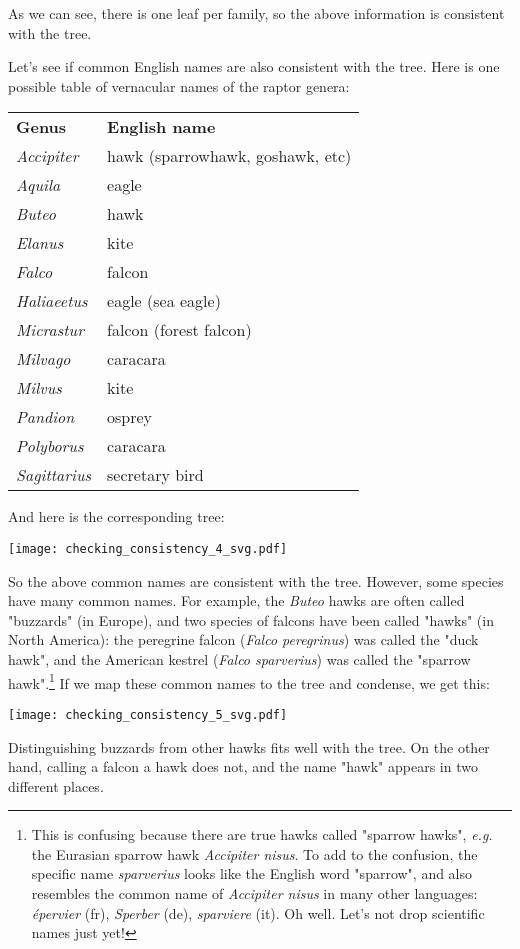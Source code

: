 \bigskip{}
\noindent{}As we can see, there is one leaf per family, so the above
information is consistent with the tree.

Let's see if common English names are also consistent with the tree. Here is
one possible table of vernacular names of the raptor genera: 

\bigskip{}
\begin{tabular}{ll}
\textbf{Genus} & \textbf{English name} \\
\textit{Accipiter} & hawk (sparrowhawk, goshawk, etc)\\
\textit{Aquila} & eagle  \\
\textit{Buteo} & hawk \\
\textit{Elanus} & kite \\
\textit{Falco} & falcon \\
\textit{Haliaeetus} & eagle (sea eagle) \\
\textit{Micrastur} & falcon (forest falcon)\\
\textit{Milvago} & caracara \\
\textit{Milvus} & kite \\
\textit{Pandion} & osprey \\
\textit{Polyborus} & caracara \\
\textit{Sagittarius} & secretary bird
\end{tabular}
\bigskip{}

And here is the corresponding tree:


\texttt{[image: checking\_consistency\_4\_svg.pdf]}
\bigskip{}

So the above common names are consistent with the tree. However, some species
have many common names. For example, the \textit{Buteo} hawks are often called
"buzzards" (in Europe), and two species of falcons have been called "hawks" (in
North America): the peregrine falcon (\textit{Falco peregrinus}) was called the
"duck hawk", and the American kestrel (\textit{Falco sparverius}) was called
the "sparrow hawk".\footnote{This is confusing because there are true hawks
called "sparrow hawks", \emph{e.g.} the Eurasian sparrow hawk \textit{Accipiter
nisus}. To add to the confusion, the specific name \textit{sparverius} looks
like the English word "sparrow", and also resembles the common name of
\textit{Accipiter nisus} in many other languages: \textit{\'{e}pervier} (fr), \textit{Sperber} (de), \textit{sparviere} (it). Oh well. Let's not drop scientific names just yet!} If we
map these common names to the tree and condense, we get this:


\texttt{[image: checking\_consistency\_5\_svg.pdf]}
\bigskip{}

\noindent{}Distinguishing buzzards from other hawks fits well with the tree. On
the other hand, calling a falcon a hawk does not, and the name "hawk" appears
in two different places.
